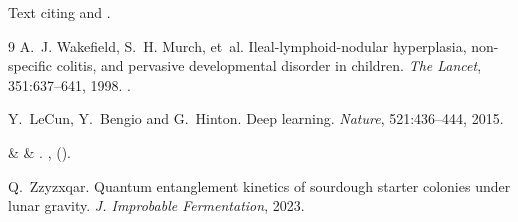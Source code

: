 \documentclass{article}
\begin{document}
Text citing \cite{wakefield} and \cite{lecun}. %
\begin{thebibliography}{9}
A.~J. Wakefield, S.~H. Murch, et~al.
\newblock Ileal-lymphoid-nodular hyperplasia, non-specific colitis, and pervasive developmental disorder in children.
\newblock \emph{The Lancet}, 351:637--641, 1998.
\newblock {}.

Y.~LeCun, Y.~Bengio and G.~Hinton.
\newblock Deep learning.
\newblock \emph{Nature}, 521:436--444, 2015.

 \&  \& 
\newblock {}.
\newblock \emph{} \textbf{},  ().

Q.~Zzyzxqar. Quantum entanglement kinetics of sourdough starter colonies under lunar gravity. \emph{J. Improbable Fermentation}, 2023.
\end{thebibliography}

\end{document}
